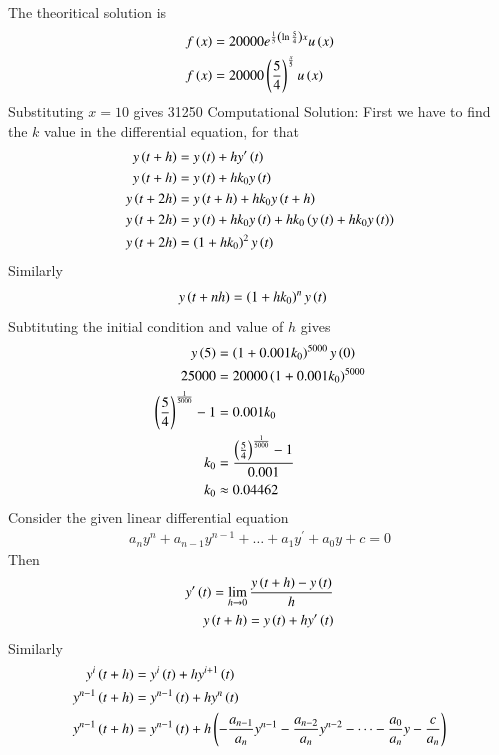 \documentclass[journal]{IEEEtran}
\begin{document}
The theoritical solution is 
\begin{align}
	f\left(x\right) &= 20000e^{\frac{1}{5}\left(\ln{\frac{5}{4}}\right)x}u\left(x\right)\\
	f\left(x\right) &= 20000\left(\frac{5}{4}\right)^{\frac{x}{5}}u\left(x	\right)
\end{align}
Substituting $x=10$ gives 31250
\newline
Computational Solution:\newline
First we have to find the $k$ value in the differential equation, for that
\begin{align}
	y\left(t+h\right) &= y\left(t\right) + hy^\prime\left(t\right)\\
	y\left(t+h\right) &= y\left(t\right) + hk_{0}y\left(t\right)\\
	y\left(t+2h\right) &= y\left(t+h\right) + hk_{0}y\left(t+h\right)\\
	y\left(t+2h\right) &= y\left(t\right) + hk_{0}y\left(t\right) + hk_{0}\left(y\left(t\right) + hk_{0}y\left(t\right)\right)\\
	y\left(t+2h\right) &= \left(1+hk_{0}\right)^2y\left(t\right)
\end{align}
Similarly
\begin{align}
	y\left(t+nh\right) &= \left(1+hk_{0}\right)^ny\left(t\right)
\end{align}
Subtituting the initial condition and value of $h$ gives
\begin{align}
	y\left(5\right) &= \left(1+0.001k_{0}\right)^{5000}y\left(0\right)\\
	25000 &= 20000\left(1+0.001k_{0}\right)^{5000}\\
	\left(\frac{5}{4}\right)^{\frac{1}{5000}} - 1 &= 0.001k_{0}\\
	k_{0} &= \frac{\left(\frac{5}{4}\right)^{\frac{1}{5000}} - 1}{0.001}\\
	k_{0} &\approx 0.04462
\end{align}
Consider the given linear differential equation
\begin{align}
	a_{n}y^n + a_{n-1}y^{n-1} + \dots + a_{1}y^\prime + a_{0}y + c = 0
\end{align}
Then
\begin{align}
	y^{\prime}\left(t\right) = \lim_{h\to 0}\frac{y\left(t+h\right) - y\left(t\right)}{h}\\
	y\left(t+h\right) = y\left(t\right) + hy^{\prime}\left(t\right)
\end{align}
Similarly
\begin{align}
	y^{i}\left(t+h\right) &= y^{i}\left(t\right) + hy^{i+1}\left(t\right)\\
	y^{n-1}\left(t+h\right) &= y^{n-1}\left(t\right) + hy^{n}\left(t\right)\\
	y^{n-1}\left(t+h\right) &= y^{n-1}\left(t\right) + h\left(-\frac{a_{n-1}}{a_n}y^{n-1}-\frac{a_{n-2}}{a_n}y^{n-2} - \dots -\frac{a_{0}}{a_n}y - \frac{c}{a_n}\right)
\end{align}
\end{document}
